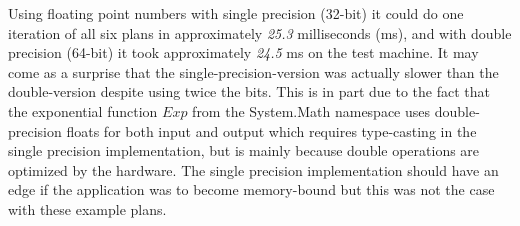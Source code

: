 Using floating point numbers with single precision (32-bit) it could do one iteration of all six plans in approximately \emph{25.3} milliseconds (ms), and with double precision (64-bit) it took approximately \emph{24.5} ms on the test machine.
It may come as a surprise that the single-precision-version was actually slower than the double-version despite using twice the bits.
This is in part due to the fact that the exponential function $Exp$ from the System.Math namespace uses double-precision floats for both input and output which requires type-casting in the single precision implementation, but is mainly because double operations are optimized by the hardware\cite{northrup2008mcts}.
The single precision implementation should have an edge if the application was to become memory-bound but this was not the case with these example plans.